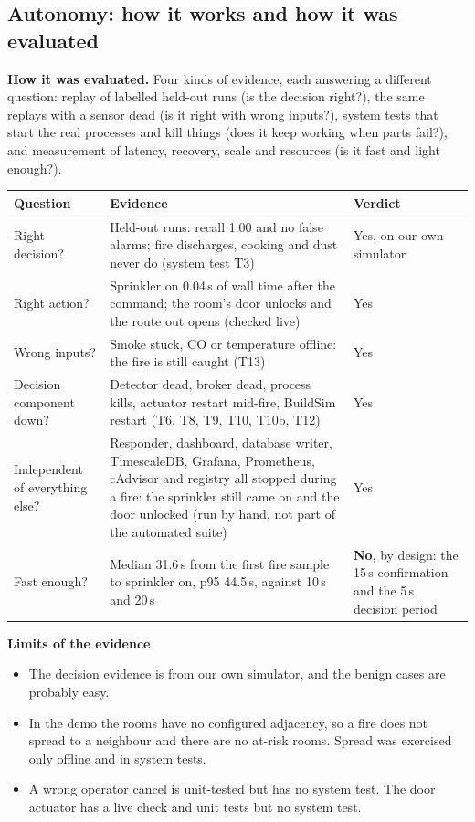 \documentclass[11pt]{article}
\providecommand{\tightlist}{\setlength{\itemsep}{0pt}\setlength{\parskip}{0pt}}
\begin{document}
\subsection{Autonomy: how it works and how it was evaluated}\label{sec:autonomy}
\textbf{How it was evaluated.} Four kinds of evidence, each answering a different question: replay of labelled held-out runs (is the decision right?), the same replays with a sensor dead (is it right with wrong inputs?), system tests that start the real processes and kill things (does it keep working when parts fail?), and measurement of latency, recovery, scale and resources (is it fast and light enough?).
\begin{center}
\begin{tabular}{@{}L{3.3cm}L{8.3cm}L{3.4cm}@{}}
\toprule
Question & Evidence & Verdict\\
\midrule
Right decision? & Held-out runs: recall 1.00 and no false alarms; fire discharges, cooking and dust never do (system test T3) & Yes, on our own simulator\\
Right action? & Sprinkler on 0.04\,s of wall time after the command; the room's door unlocks and the route out opens (checked live) & Yes\\
Wrong inputs? & Smoke stuck, CO or temperature offline: the fire is still caught (T13) & Yes\\
Decision component down? & Detector dead, broker dead, process kills, actuator restart mid-fire, BuildSim restart (T6, T8, T9, T10, T10b, T12) & Yes\\
Independent of everything else? & Responder, dashboard, database writer, TimescaleDB, Grafana, Prometheus, cAdvisor and registry all stopped during a fire: the sprinkler still came on and the door unlocked (run by hand, not part of the automated suite) & Yes\\
Fast enough? & Median 31.6\,s from the first fire sample to sprinkler on, p95 44.5\,s, against 10\,s and 20\,s & \textbf{No}, by design: the 15\,s confirmation and the 5\,s decision period\\
\bottomrule
\end{tabular}
\end{center}
\textbf{Limits of the evidence}
\begin{itemize}\tightlist
\item The decision evidence is from our own simulator, and the benign cases are probably easy.
\item In the demo the rooms have no configured adjacency, so a fire does not spread to a neighbour and there are no at-risk rooms. Spread was exercised only offline and in system tests.
\item A wrong operator cancel is unit-tested but has no system test. The door actuator has a live check and unit tests but no system test.
\end{itemize}
\end{document}
